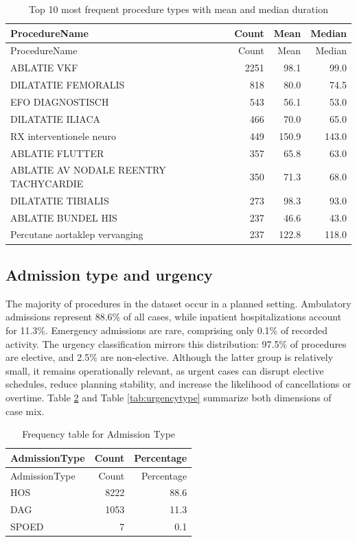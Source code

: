 \documentclass[
]{article}
\begin{document}
\begin{longtable}[]{@{}lrrr@{}}
\caption{Top 10 most frequent procedure types with mean and median
duration \label{tab:top10dur}}\tabularnewline
\toprule\noalign{}
ProcedureName & Count & Mean & Median \\
\midrule\noalign{}
\endfirsthead
\toprule\noalign{}
ProcedureName & Count & Mean & Median \\
\midrule\noalign{}
\endhead
\bottomrule\noalign{}
\endlastfoot
ABLATIE VKF & 2251 & 98.1 & 99.0 \\
DILATATIE FEMORALIS & 818 & 80.0 & 74.5 \\
EFO DIAGNOSTISCH & 543 & 56.1 & 53.0 \\
DILATATIE ILIACA & 466 & 70.0 & 65.0 \\
RX interventionele neuro & 449 & 150.9 & 143.0 \\
ABLATIE FLUTTER & 357 & 65.8 & 63.0 \\
ABLATIE AV NODALE REENTRY TACHYCARDIE & 350 & 71.3 & 68.0 \\
DILATATIE TIBIALIS & 273 & 98.3 & 93.0 \\
ABLATIE BUNDEL HIS & 237 & 46.6 & 43.0 \\
Percutane aortaklep vervanging & 237 & 122.8 & 118.0 \\
\end{longtable}

\subsection{Admission type and
urgency}\label{admission-type-and-urgency}

The majority of procedures in the dataset occur in a planned setting.
Ambulatory admissions represent 88.6\% of all cases, while inpatient
hospitalizations account for 11.3\%. Emergency admissions are rare,
comprising only 0.1\% of recorded activity. The urgency classification
mirrors this distribution: 97.5\% of procedures are elective, and 2.5\%
are non-elective. Although the latter group is relatively small, it
remains operationally relevant, as urgent cases can disrupt elective
schedules, reduce planning stability, and increase the likelihood of
cancellations or overtime. Table \ref{tab:admissiontype} and Table
\ref{tab:urgencytype} summarize both dimensions of case mix.

\begin{longtable}[]{@{}lrr@{}}
\caption{Frequency table for Admission Type
\label{tab:admissiontype}}\tabularnewline
\toprule\noalign{}
AdmissionType & Count & Percentage \\
\midrule\noalign{}
\endfirsthead
\toprule\noalign{}
AdmissionType & Count & Percentage \\
\midrule\noalign{}
\endhead
\bottomrule\noalign{}
\endlastfoot
HOS & 8222 & 88.6 \\
DAG & 1053 & 11.3 \\
SPOED & 7 & 0.1 \\
\end{longtable}
\end{document}
